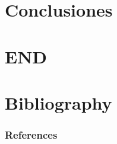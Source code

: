 \documentclass{beamer}
\begin{document}
\section{Conclusiones} %



\section*{END}

\section*{Bibliography}
\begin{frame}[allowframebreaks]
	\frametitle{References}
    
	
\end{frame}
\end{document}

